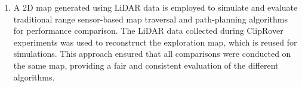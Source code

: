 \begin{enumerate}[label={$\arabic*$.},nolistsep,leftmargin=*]
\item {} A 2D map generated using LiDAR data is employed to simulate and evaluate traditional range sensor-based map traversal and path-planning algorithms for performance comparison. The LiDAR data collected during ClipRover experiments was used to reconstruct the exploration map, which is reused for simulations. This approach ensured that all comparisons were conducted on the same map, providing a fair and consistent evaluation of the different algorithms.
\end{enumerate}

\vspace{-1mm}
